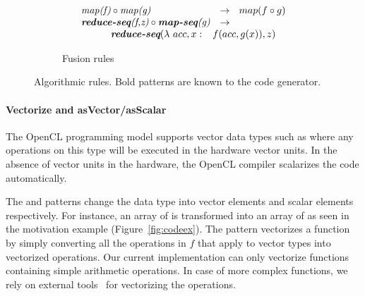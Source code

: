\begin{figure}[t]
\vspace{\ruleSpace}
\begin{subfigure}[b]{1\linewidth}
\begin{mdframed}
\vspace{-.5em}
$$
\begin{array}{ll}
\pat{map(f)} \circ \pat{map(g)}                                & \rightarrow \ \ map(f \circ g)\\
\pat{\textbf{reduce-seq}(f,z)} \circ \pat{\textbf{map-seq}(g)} & \rightarrow \\
{\hspace{3em}} \pat{\textbf{reduce-seq}}(\lambda\ acc,x:& \hspace{-.75em}f(acc, g(x)), z)\\  %
\end{array}
$$
\end{mdframed}
  \caption{Fusion rules}
   \label{fig:algo:fusion}
\end{subfigure}

\vspace{-2em}
\caption{Algorithmic rules. Bold patterns are known to the code generator.}
\label{fig:algo}
\end{figure}


\paragraph{Vectorize and asVector/asScalar}
The OpenCL programming model supports vector data types such as  where any operations on this type will be executed in the hardware vector units.
In the absence of vector units in the hardware, the OpenCL compiler scalarizes the code automatically.

The  and  patterns change the data type into vector elements and scalar elements respectively.
For instance, an array of  is transformed into an array of  as seen in the motivation example (Figure~\ref{fig:codeex}).
The  pattern vectorizes a function by simply converting all the operations in $f$ that apply to vector types into vectorized operations. 
Our current implementation can only vectorize functions containing simple arithmetic operations. %
In case of more complex functions, we rely on external tools~\cite{garrenberg11vect} for vectorizing the operations. %

